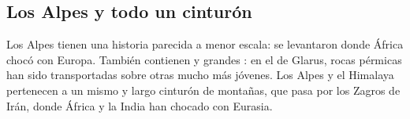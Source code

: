 \subsection{Los Alpes y todo un cinturón}

Los Alpes tienen una historia parecida a menor escala: se levantaron donde
África chocó con Europa. También contienen  y grandes
: en el  de Glarus, rocas pérmicas han sido
transportadas sobre otras mucho más jóvenes. Los Alpes y el Himalaya
pertenecen a un mismo y largo cinturón de montañas, que pasa por los Zagros de
Irán, donde África y la India han chocado con Eurasia.

